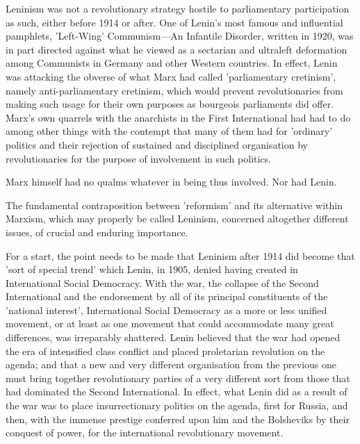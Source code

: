 Leninism was not a revolutionary strategy hostile to parliamentary participation as such, either before 1914 or after. One of Lenin's most famous and influential pamphlets, 'Left-Wing' Communism—An Infantile Disorder, written in 1920, was in part directed against what he viewed as a sectarian and ultraleft deformation among Communists in Germany and other Western countries. In effect, Lenin was attacking the obverse of what Marx had called 'parliamentary cretinism', namely anti\hyp{}parliamentary cretinism, which would prevent revolutionaries from making such usage for their own purposes as bourgeois parliaments did offer. Marx's own quarrels with the anarchists in the First International had had to do among other things with the contempt that many of them had for 'ordinary' politics and their rejection of sustained and disciplined organisation by revolutionaries for the purpose of involvement in such politics.

Marx himself had no qualms whatever in being thus involved. Nor had Lenin.

The fundamental contraposition between 'reformism' and its alternative within Marxism, which may properly be called Leninism, concerned altogether different issues, of crucial and enduring importance.

For a start, the point needs to be made that Leninism after 1914 did become that 'sort of special trend' which Lenin, in 1905, denied having created in International Social Democracy. With the war, the collapse of the Second International and the endorsement by all of its principal constituents of the 'national interest', International Social Democracy as a more or less unified movement, or at least as one movement that could accommodate many great differences, was irreparably shattered. Lenin believed that the war had opened the era of intensified class conflict and placed proletarian revolution on the agenda; and that a new and very different organisation from the previous one must bring together revolutionary parties of a very different sort from those that had dominated the Second International. In effect, what Lenin did as a result of the war was to place insurrectionary politics on the agenda, first for Russia, and then, with the immense prestige conferred upon him and the Bolsheviks by their conquest of power, for the international revolutionary movement.

